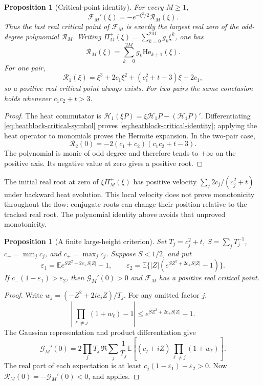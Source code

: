 \documentclass[11pt]{article}
\newtheorem{proposition}[theorem]{Proposition}
\theoremstyle{definition}
\theoremstyle{remark}
\newcommand{\E}{\mathbb E}
\begin{document}
\begin{proposition}[Critical-point identity]
\label{prop:heatblock-critical-zero}
For every $M\ge1$,
\begin{equation}
 \mathscr F_M'(\xi)=-e^{-\xi^2/2}\mathscr R_M(\xi).
 \label{eq:heatblock-critical-identity}
\end{equation}
Thus the last real critical point of $\mathscr F_M$ is exactly the
largest real zero of the odd-degree polynomial $\mathscr R_M$.
Writing $\Pi_M^+(\xi)=\sum_{k=0}^{2M}g_k\xi^k$, one has
\[
 \mathscr R_M(\xi)=\sum_{k=0}^{2M}g_k\mathrm{He}_{k+1}(\xi).
\]
For one pair,
\[
 \mathscr R_1(\xi)=\xi^3+2c_1\xi^2+(c_1^2+t-3)\xi-2c_1,
\]
so a positive real critical point always exists.  For two pairs the
same conclusion holds whenever $c_1c_2+t>3$.
\end{proposition}

\begin{proof}
The heat commutator is
$\mathcal H_1(\xi P)=\xi\mathcal H_1P-(\mathcal H_1P)'$.
Differentiating \eqref{eq:heatblock-critical-symbol} proves
\eqref{eq:heatblock-critical-identity}; applying the heat operator to
monomials proves the Hermite expansion.  In the two-pair case,
\[
 \mathscr R_2(0)=-2(c_1+c_2)(c_1c_2+t-3).
\]
The polynomial is monic of odd degree and therefore tends to $+\infty$
on the positive axis.  Its negative value at zero gives a positive root.
\end{proof}

The initial real root at zero of $\xi\Pi_M^+(\xi)$ has positive
velocity $\sum_j2c_j/(c_j^2+t)$ under backward heat evolution.
This local velocity does not prove monotonicity throughout the flow:
conjugate roots can change their position relative to the tracked real
root.  The polynomial identity above avoids that unproved monotonicity.

\begin{proposition}[A finite large-height criterion]
\label{prop:heatblock-large-height}
Set $T_j=c_j^2+t$, $S=\sum_jT_j^{-1}$,
$c_- =\min_jc_j$, and $c_+=\max_jc_j$.  Suppose $S<1/2$, and put
\[
 \varepsilon_1=\E e^{SZ^2+2c_+S|Z|}-1,\qquad
 \varepsilon_2=\E\{|Z|(e^{SZ^2+2c_+S|Z|}-1)\}.
\]
If $c_-(1-\varepsilon_1)>\varepsilon_2$, then
$\mathscr G_M'(0)>0$ and $\mathscr F_M$ has a positive real
critical point.
\end{proposition}

\begin{proof}
Write
$w_j=(-Z^2+2ic_jZ)/T_j$.  For any omitted factor $j$,
\[
 \left|\prod_{\ell\ne j}(1+w_\ell)-1\right|
 \le e^{SZ^2+2c_+S|Z|}-1.
\]
The Gaussian representation and product differentiation give
\[
 \mathscr G_M'(0)=2\prod_jT_j\,
 \Re\sum_j\frac1{T_j}
 \E\left[(c_j+iZ)\prod_{\ell\ne j}(1+w_\ell)\right].
\]
The real part of each expectation is at least
$c_j(1-\varepsilon_1)-\varepsilon_2>0$.
Now $\mathscr R_M(0)=-\mathscr G_M'(0)<0$, and
 applies.
\end{proof}
\end{document}
